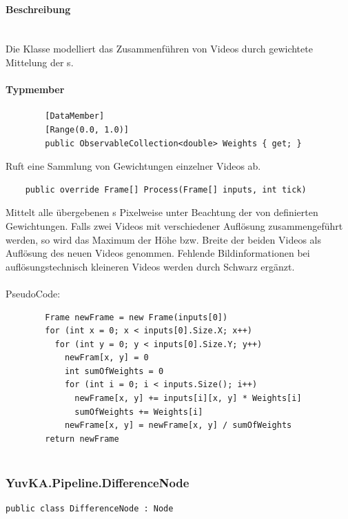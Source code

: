 \paragraph{Beschreibung}~\\
Die Klasse  modelliert das Zusammenführen von Videos durch gewichtete Mittelung der s.

\paragraph{Typmember}
\begin{itemize}

	\begin{verbatim}
		[DataMember]
		[Range(0.0, 1.0)]
		public ObservableCollection<double> Weights { get; }
	\end{verbatim}
	Ruft eine Sammlung von Gewichtungen einzelner Videos ab.

	\begin{verbatim}
	public override Frame[] Process(Frame[] inputs, int tick)
	\end{verbatim}
	Mittelt alle übergebenen s Pixelweise unter Beachtung der von  definierten Gewichtungen. Falls zwei Videos mit verschiedener Auflösung zusammengeführt werden, so wird das Maximum der Höhe bzw. Breite der beiden Videos als Auflösung des neuen Videos genommen. Fehlende Bildinformationen bei auflösungstechnisch kleineren Videos werden durch Schwarz ergänzt.\\~\\
	PseudoCode:
	\begin{verbatim}
		Frame newFrame = new Frame(inputs[0])
		for (int x = 0; x < inputs[0].Size.X; x++)
		  for (int y = 0; y < inputs[0].Size.Y; y++)
		    newFram[x, y] = 0
		    int sumOfWeights = 0
		    for (int i = 0; i < inputs.Size(); i++)
		      newFrame[x, y] += inputs[i][x, y] * Weights[i]
		      sumOfWeights += Weights[i]
		    newFrame[x, y] = newFrame[x, y] / sumOfWeights
		return newFrame
		
	\end{verbatim}
	
\end{itemize}

\subsubsection{YuvKA.Pipeline.DifferenceNode}

\begin{verbatim}
public class DifferenceNode : Node
\end{verbatim}

